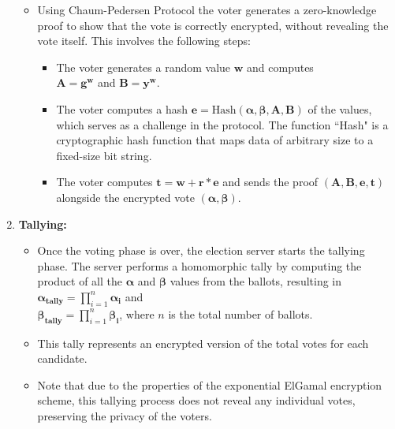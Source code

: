 \begin{enumerate}
\begin{itemize}
        \item Using Chaum-Pedersen Protocol the voter generates a zero-knowledge proof to show that the vote is correctly encrypted, without revealing the vote itself. This involves the following steps:
        \begin{itemize}
            \item The voter generates a random value $\textbf{w}$ and computes \\
            $\textbf{A} = \textbf{g}^{\textbf{w}}$ and $\textbf{B} = \boldsymbol{y}^{\textbf{w}}$.
            \item The voter computes a hash $\textbf{e} = \text{Hash}(\boldsymbol{\alpha}, \boldsymbol{\beta}, \textbf{A}, \textbf{B})$ of the values, which serves as a challenge in the protocol. The function ``Hash" is a cryptographic hash function that maps data of arbitrary size to a fixed-size bit string.
            \item The voter computes $\textbf{t} = \textbf{w} + \textbf{r} * \textbf{e}$ and sends the proof $(\textbf{A}, \textbf{B}, \textbf{e}, \textbf{t})$ alongside the encrypted vote $(\boldsymbol{\alpha}, \boldsymbol{\beta})$.
        \end{itemize}
 
    \end{itemize}


    
    \item \textbf{Tallying:}
        \begin{itemize}
        \item Once the voting phase is over, the election server starts the tallying phase. The server performs a homomorphic tally by computing the product of all the \( \mathbf{\alpha} \) and \( \mathbf{\beta} \) values from the ballots, resulting in \( \mathbf{\alpha_{tally}} = \prod_{i=1}^{n} \mathbf{\alpha_i} \) and\\
        \( \mathbf{\beta_{tally}} = \prod_{i=1}^{n} \mathbf{\beta_i} \), where \( n \) is the total number of ballots.
        \item This tally represents an encrypted version of the total votes for each candidate.
        \item Note that due to the properties of the exponential ElGamal encryption scheme, this tallying process does not reveal any individual votes, preserving the privacy of the voters.
    \end{itemize}



\end{enumerate}
